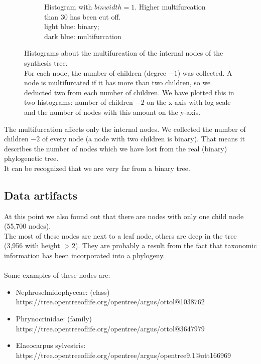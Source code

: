 \begin{figure}
\begin{subfigure}[b]{0.4\textwidth}
        \caption{Histogram with $binwidth = 1$. Higher multifurcation than 30 has been cut off. \\ light blue: binary; \\ dark blue: multifurcation}
      \end{subfigure}
      \caption{Histograms about the multifurcation of the internal nodes of the synthesis tree. \\
        For each node, the number of children (degree $-1$) was collected. A node is multifurcated 
        if it has more than two children, so we deducted two from each number of children. We have 
        plotted this in two histograms: number of children $-2$ on the x-axis with log scale and the 
        number of nodes with this amount on the y-axis.}
      \label{fig:childrenOfNodes}
    \end{figure}
    The multifurcation affects only the internal nodes. We collected the number of children $-2$ of 
      every node (a node with two children is binary). That means it describes the number of nodes 
      which we have lost from the real (binary) phylogenetic tree. \\
    It can be recognized that we are very far from a binary tree. \\

    \subsection{Data artifacts}
      At this point we also found out that there are nodes with only one child node (55,700 nodes). \\
      The most of these nodes are next to a leaf node, others are deep in the tree (3,956 with height 
        $>2$). They are probably a result from the fact that taxonomic information has been incorporated 
        into a phylogeny. \\
       \\
      Some examples of these nodes are:
      \begin{itemize}
        \item Nephroselmidophyceae: (class) \\
          https://tree.opentreeoflife.org/opentree/argus/ottol@1038762
        \item Phrynocrinidae: (family) \\
          https://tree.opentreeoflife.org/opentree/argus/ottol@3647979
        \item Elaeocarpus sylvestris: \\
          https://tree.opentreeoflife.org/opentree/argus/opentree9.1@ott166969
      \end{itemize}

